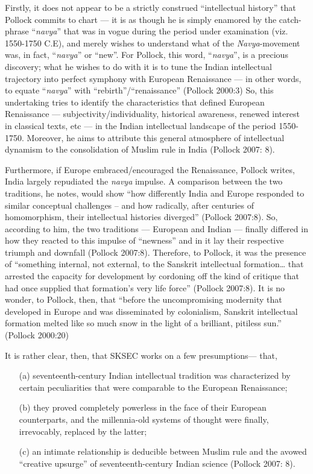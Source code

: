 Firstly, it does not appear to be a strictly construed “intellectual history” that Pollock commits to chart — it is as though he is simply enamored by the catch-phrase “{\sl navya}” that was in vogue during the period under examination (viz. 1550-1750 C.E), and merely wishes to understand what of the {\sl Navya}-movement was, in fact, “{\sl navya}” or “new”. For Pollock, this word, “{\sl navya}”, is a precious discovery; what he wishes to do with it is to tune the Indian intellectual trajectory into perfect symphony with European Renaissance — in other words, to equate “{\sl navya}” with “rebirth”/“renaissance” (Pollock 2000:3) So, this undertaking tries to identify the characteristics that defined European Renaissance — subjectivity/individuality, historical awareness, renewed interest in classical texts, etc — in the Indian intellectual landscape of the period 1550-1750. Moreover, he aims to attribute this general atmosphere of intellectual dynamism to the consolidation of Muslim rule in India (Pollock 2007: 8).

Furthermore, if Europe embraced/encouraged the Renaissance, Pollock writes, India largely repudiated the {\sl navya} impulse. A comparison between the two traditions, he notes, would show “how differently India and Europe responded to similar conceptual challenges – and how radically, after centuries of homomorphism, their intellectual histories diverged” (Pollock 2007:8). So, according to him, the two traditions — European and Indian — finally differed in how they reacted to this impulse of “newness” and in it lay their respective triumph and downfall (Pollock 2007:8). Therefore, to Pollock, it was the presence of “something internal, not external, to the Sanskrit intellectual formation… that arrested the capacity for development by cordoning off the kind of critique that had once supplied that formation’s very life force” (Pollock 2007:8). It is no wonder, to Pollock, then, that “before the uncompromising modernity that developed in Europe and was disseminated by colonialism, Sanskrit intellectual formation melted like so much snow in the light of a brilliant, pitiless sun.” (Pollock 2000:20)

It is rather clear, then, that SKSEC works on a few presumptions— that, 
\begin{itemize}
\item[(a)] seventeenth-century Indian intellectual tradition was characterized by certain peculiarities that were comparable to the European Renaissance;

\item[(b)] they proved completely powerless in the face of their European counterparts, and the millennia-old systems of thought were finally, irrevocably, replaced by the latter; 

\item[(c)] an intimate relationship is deducible between Muslim rule and the avowed “creative upsurge” of seventeenth-century Indian science (Pollock 2007: 8).
\end{itemize}

